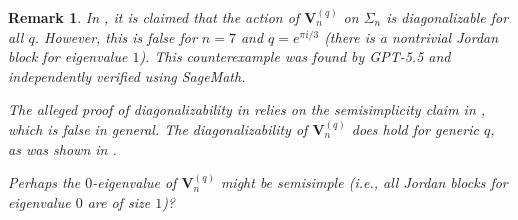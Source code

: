 \documentclass[revision]{FPSAC2025}
\newtheorem{remark}{Remark}
\begin{document}
\begin{remark}
In \cite{CalderbankHanlonSundaram94}, it is claimed that the action of $\mathbf{V}_n^{(q)}$ on $\Sigma_n$ is diagonalizable for all $q$.
However, this is false for $n = 7$ and $q = e^{\pi i/3}$ (there is a nontrivial Jordan block for eigenvalue $1$).
This counterexample was found by GPT-5.5 and independently verified using SageMath.

The alleged proof of diagonalizability in \cite{CalderbankHanlonSundaram94} relies on the semisimplicity claim in \cite[Corollary 2.3]{CalderbankHanlonSundaram94}, which is false in general.
The diagonalizability of $\mathbf{V}_n^{(q)}$ does hold for generic $q$, as was shown in \cite[Theorem 5.14]{NCSF2}.

Perhaps the $0$-eigenvalue of $\mathbf{V}_n^{(q)}$ might be semisimple (i.e., all Jordan blocks for eigenvalue $0$ are of size $1$)?
\end{remark}



\printbibliography
\end{document}
